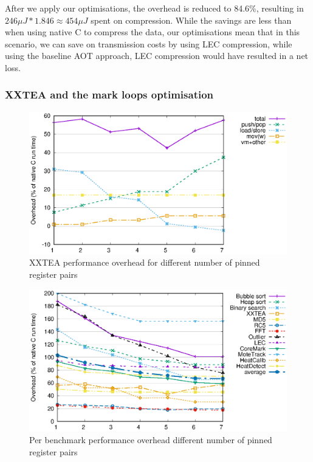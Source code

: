 After we apply our optimisations, the overhead is reduced to 84.6\%, resulting in $246 \mu J * 1.846 \approx 454 \mu J$ spent on compression. While the savings are less than when using native C to compress the data, our optimisations mean that in this scenario, we can save on transmission costs by using LEC compression, while using the baseline AOT approach, LEC compression would have resulted in a net loss.

\subsubsection{XXTEA and the mark loops optimisation}

\begin{figure}
\centering
\includegraphics[width=\mygraphsize]{pinnedregs-performance-xxtea.eps}
\caption{XXTEA performance overhead for different number of pinned register pairs}
\label{fig-performance-pinnedregs-xxtea-per-opcode-category}
\end{figure}

\begin{figure}
\centering
\includegraphics[width=\mygraphsize]{pinnedregs-performance-all-benchmarks.eps}
\caption{Per benchmark performance overhead different number of pinned register pairs}
\label{fig-performance-pinnedregs-per-benchmark}
\end{figure}

